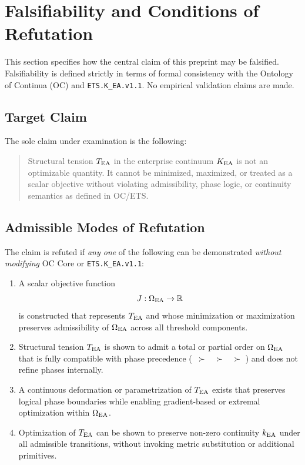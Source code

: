 ﻿%

\section{Falsifiability and Conditions of Refutation}

This section specifies how the central claim of this preprint may be
falsified. Falsifiability is defined strictly in terms of formal
consistency with the Ontology of Continua (OC) and
\texttt{ETS.K\_EA.v1.1}. No empirical validation claims are made.

\subsection{Target Claim}

The sole claim under examination is the following:

\begin{quote}
Structural tension $T_{\mathrm{EA}}$ in the enterprise continuum $K_{\mathrm{EA}}$ is not an
optimizable quantity. It cannot be minimized, maximized, or treated as a
scalar objective without violating admissibility, phase logic, or
continuity semantics as defined in OC/ETS.
\end{quote}

\subsection{Admissible Modes of Refutation}

The claim is refuted if \emph{any one} of the following can be
demonstrated \emph{without modifying} OC Core or
\texttt{ETS.K\_EA.v1.1}:

\begin{enumerate}
  \item A scalar objective function
        \[
        J : \Omega_{\mathrm{EA}} \rightarrow \mathbb{R}
        \]
        is constructed that represents $T_{\mathrm{EA}}$ and whose minimization or
        maximization preserves admissibility of $\Omega_{\mathrm{EA}}$ across all
        threshold components.
  \item Structural tension $T_{\mathrm{EA}}$ is shown to admit a total or partial
        order on $\Omega_{\mathrm{EA}}$ that is fully compatible with phase
        precedence (\PHASESTOP\ $\succ$ \PHASECOLLAPSE\ $\succ$
        \PHASEINERTIA\ $\succ$ \PHASESUCCESS) and does not refine phases
        internally.
  \item A continuous deformation or parametrization of $T_{\mathrm{EA}}$ exists
        that preserves logical phase boundaries while enabling
        gradient-based or extremal optimization within $\Omega_{\mathrm{EA}}$.
  \item Optimization of $T_{\mathrm{EA}}$ can be shown to preserve non-zero
        continuity $k_{\mathrm{EA}}$ under all admissible transitions, without
        invoking metric substitution or additional primitives.
\end{enumerate}

